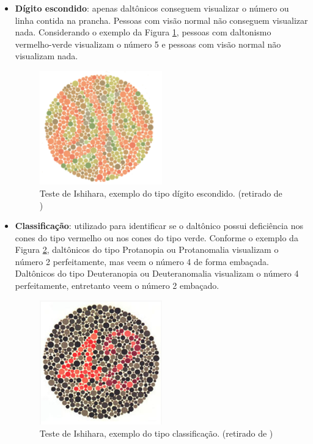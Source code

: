 \documentclass[	12pt, Times, openright, twoside, a4paper, english, brazil]{abntex2}
\begin{document}
\begin{itemize}
\item \textbf{Dígito escondido}: apenas daltônicos conseguem visualizar o número ou linha contida na prancha. Pessoas com visão normal não conseguem visualizar nada. Considerando o exemplo da Figura \ref{fig:figuraIshiharaEscondido}, pessoas com daltonismo vermelho-verde visualizam o número 5 e pessoas com visão normal não visualizam nada.

\begin{figure}[!htb]
\centering \includegraphics[width=0.5\textwidth]{figuraIshiharaEscondido.png}
\caption{Teste de Ishihara, exemplo do tipo dígito escondido. (retirado de ) \label{fig:figuraIshiharaEscondido}}
\end{figure}
 
\item \textbf{Classificação}: utilizado para identificar se o daltônico possui deficiência nos cones do tipo vermelho ou nos cones do tipo verde. Conforme o exemplo da Figura \ref{fig:figuraIshiharaClassificacao}, daltônicos do tipo Protanopia ou Protanomalia visualizam o número 2 perfeitamente, mas veem o número 4 de forma embaçada. Daltônicos do tipo Deuteranopia ou Deuteranomalia visualizam o número 4 perfeitamente, entretanto veem o número 2 embaçado.
 
\begin{figure}[!htb]
\centering \includegraphics[width=0.5\textwidth]{figuraIshiharaClassificacao.png}
\caption{Teste de Ishihara, exemplo do tipo classificação. (retirado de ) \label{fig:figuraIshiharaClassificacao}}
\end{figure}

\end{itemize}
\end{document}
